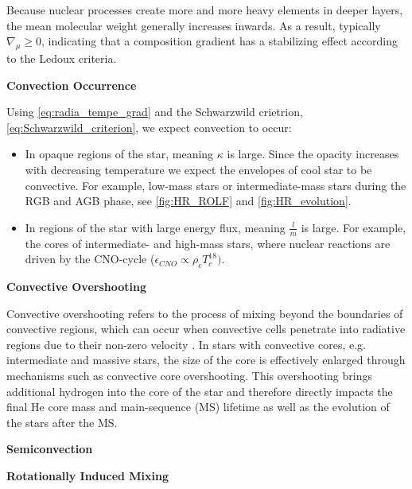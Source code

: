 Because nuclear processes create more and more heavy elements in deeper layers, the mean molecular weight generally increases inwards. As a result, typically $\nabla_{\mu} \geq 0$, indicating that a composition gradient has a stabilizing effect according to the Ledoux criteria. 

{\bf Convection Occurrence}

Using \eqref{eq:radia_tempe_grad} and the Schwarzwild crietrion, \eqref{eq:Schwarzwild_criterion}, we expect convection to occur:
\begin{itemize}
    \item In opaque regions of the star, meaning $\kappa$ is large. Since the opacity increases with decreasing temperature \citep{pols2011stellar} we expect the envelopes of cool star to be convective. For example, low-mass stars or intermediate-mass stars during the RGB and AGB phase, see \cref{fig:HR_ROLF} and \cref{fig:HR_evolution}.
    \item In regions of the star with large energy flux, meaning $\frac{l}{m}$ is large. For example, the cores of intermediate- and high-mass stars, where nuclear reactions are driven by the CNO-cycle ($\epsilon_{CNO} \propto \rho_c T_{c}^{18})$.
\end{itemize}







{\bf Convective Overshooting}

Convective overshooting refers to the process of mixing beyond the boundaries of convective regions, which can occur when convective cells penetrate into radiative regions due to their non-zero velocity \citep{alongi1993evolutionary,brott2011rotating,schootemeijer2019constraining}. In stars with convective cores, e.g. intermediate and massive stars, the size of the core is effectively enlarged through mechanisms such as convective core overshooting. This overshooting brings additional hydrogen into the core of the star and therefore directly impacts the final He core mass and main-sequence (MS) lifetime as well as the evolution of the stars after the MS.

{\bf Semiconvection}

{\bf Rotationally Induced Mixing}
